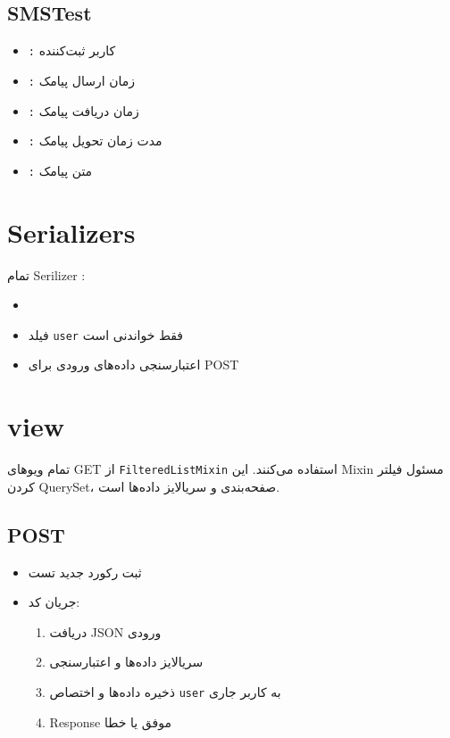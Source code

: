\documentclass{report}
\begin{document}
\subsection{SMSTest}
\begin{itemize}
    \item \texttt{:} کاربر ثبت‌کننده
    \item \texttt{:} زمان ارسال پیامک
    \item \texttt{:} زمان دریافت پیامک
    \item \texttt{:} مدت زمان تحویل پیامک  
    \item \texttt{:} متن پیامک
\end{itemize}

\section{Serializers}
تمام  Serilizer :
\begin{itemize}
    \item \texttt{}
\end{itemize}

\begin{itemize}
    \item فیلد \texttt{user} فقط خواندنی است
    \item اعتبارسنجی داده‌های ورودی برای POST
\end{itemize}


\section{view}

تمام ویوهای GET از \texttt{FilteredListMixin} استفاده می‌کنند.
این Mixin مسئول فیلتر کردن QuerySet، صفحه‌بندی و سریالایز داده‌ها است.

\subsection{POST}
\begin{itemize}
    \item ثبت رکورد جدید تست
    \item جریان کد:
    \begin{enumerate}
        \item دریافت JSON ورودی
        \item سریالایز داده‌ها و اعتبارسنجی
        \item ذخیره داده‌ها و اختصاص \texttt{user} به کاربر جاری
        \item Response موفق  یا خطا 
    \end{enumerate}
\end{itemize}
\end{document}
